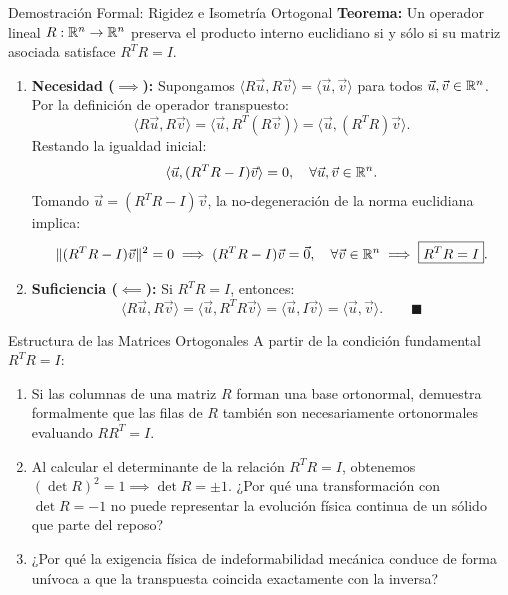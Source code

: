\documentclass[10pt,aspectratio=169]{beamer}
\begin{document}
\begin{frame}{Demostración Formal: Rigidez e Isometría Ortogonal}
  \footnotesize
  \textbf{Teorema:} Un operador lineal $R: \mathbb{R}^n \to \mathbb{R}^n$ preserva el producto interno euclidiano si y sólo si su matriz asociada satisface $R^T R = I$.
  \vspace{0.15cm}

  \begin{enumerate}\itemsep4pt
    \item \textbf{Necesidad ($\implies$):}
    Supongamos $\langle R\vec{u}, R\vec{v} \rangle = \langle \vec{u}, \vec{v} \rangle$ para todos $\vec{u}, \vec{v} \in \mathbb{R}^n$.
    Por la definición de operador transpuesto:
    \[
    \langle R\vec{u}, R\vec{v} \rangle = \langle \vec{u}, R^T(R\vec{v}) \rangle = \langle \vec{u}, (R^T R)\vec{v} \rangle.
    \]
    Restando la igualdad inicial:
    \[
    \langle \vec{u}, (R^T R - I)\vec{v} \rangle = 0, \quad \forall \vec{u}, \vec{v} \in \mathbb{R}^n.
    \]
    Tomando $\vec{u} = (R^T R - I)\vec{v}$, la no-degeneración de la norma euclidiana implica:
    \[
    \|(R^T R - I)\vec{v}\|^2 = 0 \implies (R^T R - I)\vec{v} = \vec{0}, \quad \forall \vec{v} \in \mathbb{R}^n \implies \boxed{R^T R = I}.
    \]
    \item \textbf{Suficiencia ($\impliedby$):}
    Si $R^T R = I$, entonces:
    \[
    \langle R\vec{u}, R\vec{v} \rangle = \langle \vec{u}, R^T R \vec{v} \rangle = \langle \vec{u}, I\vec{v} \rangle = \langle \vec{u}, \vec{v} \rangle. \qquad \blacksquare
    \]
  \end{enumerate}
\end{frame}

\begin{frame}{Estructura de las Matrices Ortogonales}
  \vspace{0.2cm}
  A partir de la condición fundamental $R^T R = I$:
  \vspace{0.3cm}
  \begin{enumerate}\itemsep14pt
    \item Si las columnas de una matriz $R$ forman una base ortonormal, demuestra formalmente que las filas de $R$ también son necesariamente ortonormales evaluando $R R^T = I$.
    \item Al calcular el determinante de la relación $R^T R = I$, obtenemos $(\det R)^2 = 1 \implies \det R = \pm 1$. ¿Por qué una transformación con $\det R = -1$ no puede representar la evolución física continua de un sólido que parte del reposo?
    \item ¿Por qué la exigencia física de indeformabilidad mecánica conduce de forma unívoca a que la transpuesta coincida exactamente con la inversa?
  \end{enumerate}
\end{frame}
\end{document}
